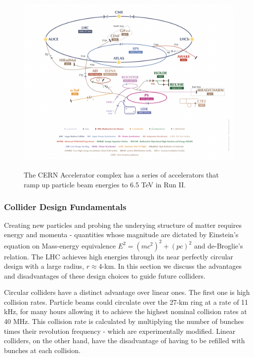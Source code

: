 \begin{figure}[!htbp]
	\centering
    \caption{The CERN Accelerator complex has a series of accelerators that ramp up particle beam energies to 6.5 TeV in Run II.}
	\includegraphics[scale=0.5]{fig/CERNAcceleratorComplex.png}
	\label{fig:accelerator_complex}
\end{figure}

\subsubsection{Collider Design Fundamentals}

Creating new particles and probing the underying structure of matter requires energy and momenta - quantities whose magnitude are dictated by Einstein's equation on Mass-energy equivalence $E^2=(mc^2)^2+(pc)^2$ and de-Broglie's relation. The LHC achieves high energies through its near perfectly circular design with a large radius, $r\approx4$-km. In this section we discuss the advantages and disadvantages of these design choices to guide  future colliders.

Circular colliders have a distinct advantage over linear ones. The first one is high collision rates. Particle beams could circulate over the 27-km ring at a rate of 11 kHz, for many hours allowing it to achieve the highest nominal collision rates at 40 MHz. This collision rate is calculated by multiplying the number of bunches times their revolution frequency - which are experimentally modified. Linear colliders, on the other hand, have the disadvantage of having to be refilled with bunches at each collision. 

